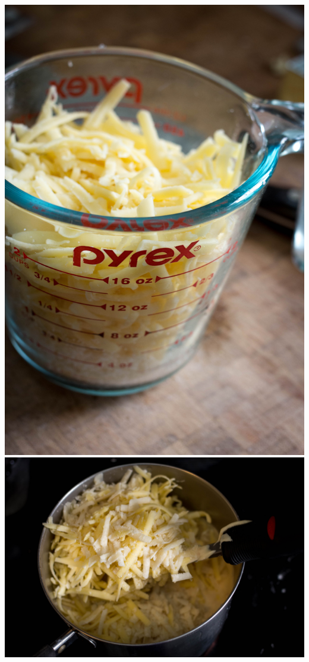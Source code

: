 \newpage
\includegraphics[height=\textheight]{food/mac-n-cheese/images/hi-res/10.jpg}
\newpage
\includegraphics[width=\textwidth]{food/mac-n-cheese/images/hi-res/11.jpg}
